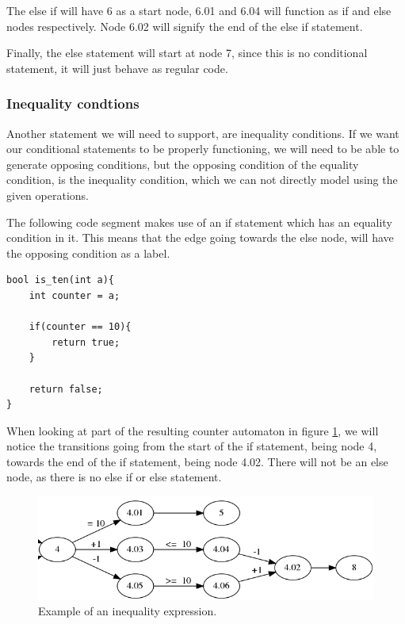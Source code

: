 \documentclass[12pt]{article}
\begin{document}
The else if will have 6 as a start node, 6.01 and 6.04 will function as if and else nodes respectively. Node 6.02 will signify the end of the else if statement.

Finally, the else statement will start at node 7, since this is no conditional statement, it will just behave as regular code.

\subsubsection{Inequality condtions}
Another statement we will need to support, are inequality conditions. If we want our conditional statements to be properly functioning, we will need to be able to generate opposing conditions, but the opposing condition of the equality condition, is the inequality condition, which we can not directly model using the given operations.

The following code segment makes use of an if statement which has an equality condition in it. This means that the edge going towards the else node, will have the opposing condition as a label.

\begin{lstlisting}[style=CStyle]
bool is_ten(int a){
	int counter = a;

	if(counter == 10){
		return true;
	}
	
	return false;
}
\end{lstlisting}

When looking at part of the resulting counter automaton in figure \ref{fig:inequality_expression}, we will notice the transitions going from the start of the if statement, being node 4, towards the end of the if statement, being node 4.02. There will not be an else node, as there is no else if or else statement.

\begin{figure}[h]
	\centering
	\includegraphics[width=\linewidth]{inequality_expression}
	\caption{Example of an inequality expression.}
	\label{fig:inequality_expression}
\end{figure}
\end{document}
